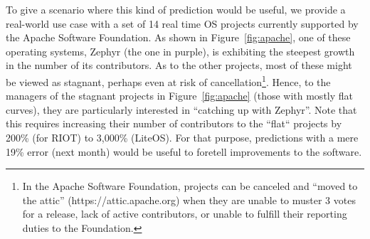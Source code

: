 \documentclass[smallextended]{svjour3}
\newcommand{\respto}[1]{
\fcolorbox{black}{black!15}{%
\label{resp:#1}%
\bf\scriptsize R{#1}}}
\begin{document}
\respto{4D} To give a scenario where this kind of prediction would be useful, we provide a real-world use case with a set of 14 real time OS projects currently supported by the Apache Software Foundation. As shown in Figure~\ref{fig:apache},  one of these operating systems, Zephyr (the one in purple), is exhibiting the steepest growth in the number of its contributors. As to the other projects, most
of these might be viewed as stagnant, perhaps even at risk of cancellation\footnote{In the Apache Software Foundation, projects can be canceled and  ``moved to the attic'' (https://attic.apache.org) when they are unable to muster 3 votes for a release, lack of active contributors, or unable to fulfill their reporting duties to the Foundation.}. 
Hence, to the managers of the stagnant
projects in Figure~\ref{fig:apache} (those with mostly flat curves),  they are particularly interested in ``catching up with  Zephyr''. Note that this
requires increasing
their number of contributors to the ``flat`` projects by 200\% (for RIOT) to 3,000\% (LiteOS). For that purpose,
predictions with a mere 19\% error (next month) would be useful
to foretell improvements to the software.





 
 
\end{document}
